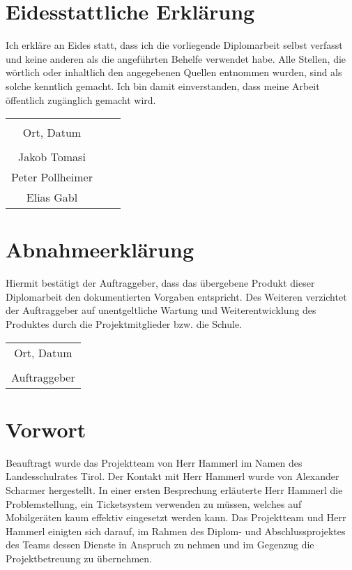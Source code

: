 \chapter*{Eidesstattliche Erklärung}
Ich erkläre an Eides statt, dass ich die vorliegende Diplomarbeit selbst verfasst und keine anderen als die angeführten Behelfe verwendet habe. Alle Stellen, die wörtlich oder inhaltlich den angegebenen Quellen entnommen wurden, sind als solche kenntlich gemacht.
Ich bin damit einverstanden, dass meine Arbeit öffentlich zugänglich gemacht wird.

\vspace{1cm}
\begin{tabular}{c c c}
	& \hspace{4cm} & \\\cline{1-1}
	Ort, Datum & & \\
	\vspace{2cm}
	& & \\\cline{1-1}
	Jakob Tomasi
	\vspace{2cm}
	& & \\\cline{1-1}
	Peter Pollheimer
	\vspace{2cm}
	& & \\\cline{1-1}
	Elias Gabl 
\end{tabular}

\chapter*{Abnahmeerklärung}
Hiermit bestätigt der Auftraggeber, dass das übergebene Produkt dieser Diplomarbeit den dokumentierten Vorgaben entspricht. Des Weiteren verzichtet der Auftraggeber auf unentgeltliche Wartung und Weiterentwicklung des Produktes durch die Projektmitglieder bzw. die Schule.

\vspace{1cm}
\begin{tabular}{c}
	\\\cline{1-1}
	Ort, Datum\\
	\vspace{2cm}
	\\\cline{1-1}
	Auftraggeber
\end{tabular}	

\chapter*{Vorwort}
Beauftragt wurde das Projektteam von Herr Hammerl im Namen des Landesschulrates Tirol. Der Kontakt mit Herr Hammerl wurde von Alexander Scharmer hergestellt. In einer ersten Besprechung erläuterte Herr Hammerl die Problemstellung, ein Ticketsystem verwenden zu müssen, welches auf Mobilgeräten kaum effektiv eingesetzt werden kann. Das Projektteam und Herr Hammerl einigten sich darauf, im Rahmen des Diplom- und Abschlussprojektes des Teams dessen Dienste in Anspruch zu nehmen und im Gegenzug die Projektbetreuung zu übernehmen.



